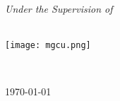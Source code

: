 \begin{titlepage}
\begin{center}
\large \textit{Under the Supervision of}\\[0cm]
\uppercase{\textbf{\SupervisorC}}\\[0.3cm]




        \centerline{\texttt{[image: mgcu.png]}}
\vfill
\vspace{0.3cm}
\normalsize{\departmentC}\\[-0.1cm] %

{\scshape\Large \UniversityC \par}\vspace{.1cm} %
\vfill

{\large \today}\\[0.1cm] %

\vfill
\end{center}
\end{titlepage}
